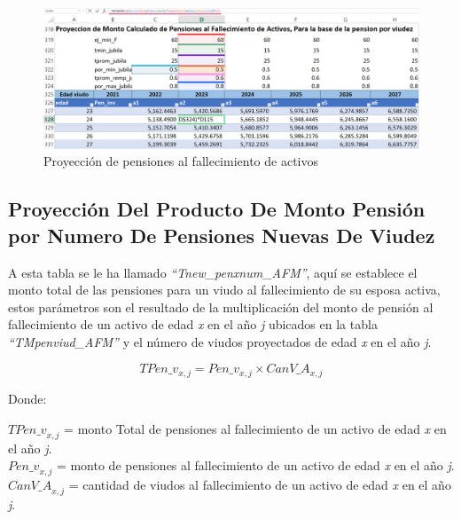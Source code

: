 \documentclass[
  letterpaper,
  DIV=11,
  numbers=noendperiod]{scrreprt}
\begin{document}
\begin{figure}

{\centering \includegraphics{images/F/Img18.png}

}

\caption{Proyección de pensiones al fallecimiento de activos}

\end{figure}

\hypertarget{proyecciuxf3n-del-producto-de-monto-pensiuxf3n-por-numero-de-pensiones-nuevas-de-viudez}{%
\subsection{Proyección Del Producto De Monto Pensión por Numero De
Pensiones Nuevas De
Viudez}\label{proyecciuxf3n-del-producto-de-monto-pensiuxf3n-por-numero-de-pensiones-nuevas-de-viudez}}

A esta tabla se le ha llamado \emph{``Tnew\_penxnum\_AFM''}, aquí se
establece el monto total de las pensiones para un viudo al fallecimiento
de su esposa activa, estos parámetros son el resultado de la
multiplicación del monto de pensión al fallecimiento de un activo de
edad \emph{x} en el año \emph{j} ubicados en la tabla
\emph{``TMpenviud\_AFM''} y el número de viudos proyectados de edad
\emph{x} en el año \emph{j}.

\begin{equation}
{TPen\_v}_{x,j}={Pen\_v}_{x,j}\times{CanV\_A}_{x,j}
\end{equation}

Donde:

\({TPen\_v}_{x,j}\) = monto Total de pensiones al fallecimiento de un
activo de edad \emph{x} en el año \emph{j}.\\
\({Pen\_v}_{x,j}\) = monto de pensiones al fallecimiento de un activo de
edad \emph{x} en el año \emph{j}.\\
\(Can{V\_A}_{x,j}\) = cantidad de viudos al fallecimiento de un activo
de edad \emph{x} en el año \emph{j}.
\end{document}
